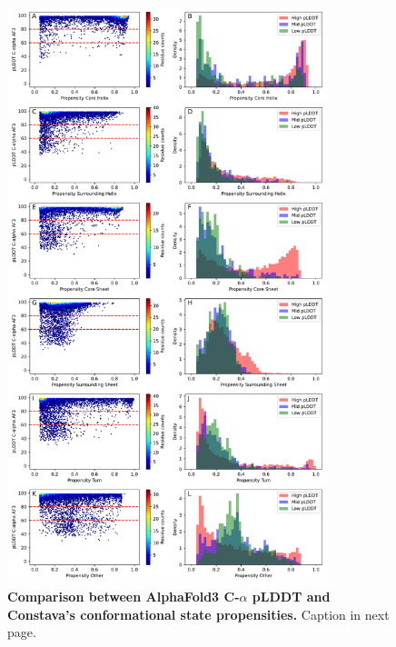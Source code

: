\begin{figure}[H]
    \centering
    \includegraphics[width=0.83\textwidth]{pLDDT/plddt_figures/af3_plddt_vs_conformational_state_propensities_hexbin_complete_hist.pdf}
    \caption{
    \textbf{Comparison between AlphaFold3 C-$\alpha$ pLDDT and Constava's conformational state propensities.} Caption in next page.
}
\end{figure}
